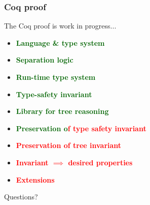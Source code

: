 \documentclass[aspectratio=169]{beamer}
\newcommand{\remph}[1] {\textcolor{red}{\textbf{#1}}}
\newcommand{\gemph}[1] {\textcolor{darkgreen}{\textbf{#1}}}
\begin{document}
\begin{frame}[fragile]
  \frametitle{Coq proof}

  The Coq proof is work in progress...
  \begin{itemize}
    \item \gemph{Language \& type system}
    \item \gemph{Separation logic}
    \item \gemph{Run-time type system}
    \item \gemph{Type-safety invariant}
    \item \gemph{Library for tree reasoning}
    \item \gemph{Preservation o}\remph{f type safety invariant}
    \item \remph{Preservation of tree invariant}
    \item \remph{Invariant $\implies$ desired properties}
    \item \remph{Extensions}
  \end{itemize}

\end{frame}

\begin{frame}[fragile]
  \begin{center}
    \Huge Questions?
  \end{center}
\end{frame}


\end{document}
